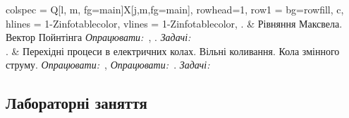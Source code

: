 \documentclass{Syllabus}
\def\lit{\textit{Опрацювати:\ }}
\def\probl{\textit{Задачі:\ }}
\begin{document}
\begin{center}
\begin{longtblr}[]{
    	colspec = {Q[l, m, fg=main]X[j,m,fg=main]},
        rowhead=1,
    	row{1} = {bg=rowfill, c},
    	hlines = {1-Z}{infotablecolor},
    	vlines = {1-Z}{infotablecolor},
    	}
		\rownumber. & Рівняння Максвела. Вектор Пой\-н\-тін\-га
		\newline \lit{}\cite[Глава IV]{Siv3}, \cite[Глава XIII]{Kalashnikov}. \probl{}\cite[\S\ 4.3]{Ponomarenko}
		\\
		\rownumber. & Перехідні процеси в електричних колах. Вільні коливання. Кола змінного струму.
		\newline \lit{}\cite[Глава IV]{Siv3}, \lit{}\cite[Глава XX]{Kalashnikov}. \probl{}\cite[Розділ 7]{Ponomarenko}
		\\
	\end{longtblr}
\end{center}

\subsection*{Лабораторні заняття}\setcounter{magicrownumbers}{0}
\end{document}
